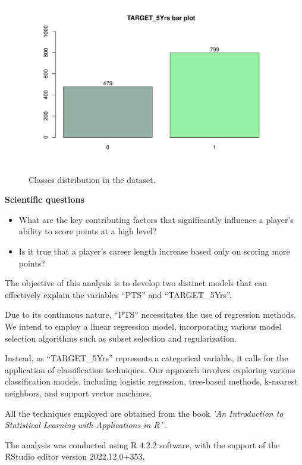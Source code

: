 \begin{figure}[h]
	\centering
	\includegraphics[width=0.6\linewidth]{ImageFiles/Histograms/bp_target5yrs.pdf}
	\caption{Classes distribution in the dataset.}
	\label{fig:target_bar_plot}
\end{figure}

\vspace{0.2cm}
\noindent
\textbf{Scientific questions}
\begin{itemize}
	\item What are the key contributing factors that significantly influence a player's ability to score points at a high level?
	\item Is it true that a player's career length increase based only on scoring more points?
\end{itemize}

\noindent
The objective of this analysis is to develop two distinct models that can effectively explain the variables ``PTS'' and ``TARGET\_5Yrs''. 
 
Due to its continuous nature, ``PTS'' necessitates the use of regression methods. We intend to employ a linear regression model, incorporating various model selection algorithms such as subset selection and regularization.

Instead, as ``TARGET\_5Yrs'' represents a categorical variable, it calls for the application of classification techniques. Our approach involves exploring various classification models, including logistic regression, tree-based methods, k-nearest neighbors, and support vector machines.

All the techniques employed are obtained from the book \textit{'An Introduction to Statistical Learning with Applications in R'} \cite{James2013}.

The analysis was conducted using R 4.2.2 software, with the support of the RStudio editor version 2022.12.0+353.
